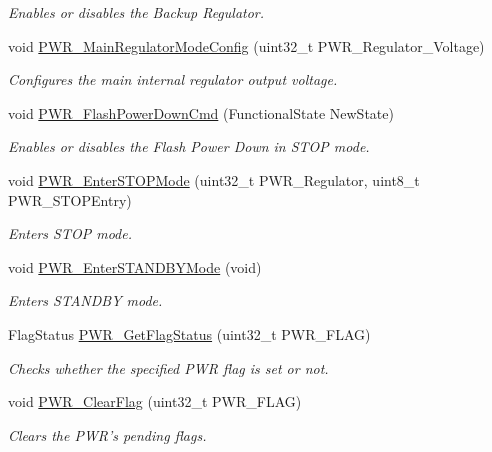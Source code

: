 \begin{DoxyCompactItemize}
\begin{DoxyCompactList}\small\item\em Enables or disables the Backup Regulator. \end{DoxyCompactList}\item 
void \hyperlink{group___p_w_r___exported___constants_gada193dea79762f379d4e666a98f28d89}{P\-W\-R\-\_\-\-Main\-Regulator\-Mode\-Config} (uint32\-\_\-t P\-W\-R\-\_\-\-Regulator\-\_\-\-Voltage)
\begin{DoxyCompactList}\small\item\em Configures the main internal regulator output voltage. \end{DoxyCompactList}\item 
void \hyperlink{group___p_w_r___exported___constants_gaf0af19a9fdf0324f2ada60c9bce1aab5}{P\-W\-R\-\_\-\-Flash\-Power\-Down\-Cmd} (Functional\-State New\-State)
\begin{DoxyCompactList}\small\item\em Enables or disables the Flash Power Down in S\-T\-O\-P mode. \end{DoxyCompactList}\item 
void \hyperlink{group___p_w_r___exported___constants_ga694676ac06a9baf50eae45adae0118ab}{P\-W\-R\-\_\-\-Enter\-S\-T\-O\-P\-Mode} (uint32\-\_\-t P\-W\-R\-\_\-\-Regulator, uint8\-\_\-t P\-W\-R\-\_\-\-S\-T\-O\-P\-Entry)
\begin{DoxyCompactList}\small\item\em Enters S\-T\-O\-P mode. \end{DoxyCompactList}\item 
void \hyperlink{group___p_w_r___exported___constants_ga00ddae00a9c327b81b24d2597b0052f3}{P\-W\-R\-\_\-\-Enter\-S\-T\-A\-N\-D\-B\-Y\-Mode} (void)
\begin{DoxyCompactList}\small\item\em Enters S\-T\-A\-N\-D\-B\-Y mode. \end{DoxyCompactList}\item 
Flag\-Status \hyperlink{group___p_w_r___exported___constants_gaa980163a4d83304280ee34942464b4ec}{P\-W\-R\-\_\-\-Get\-Flag\-Status} (uint32\-\_\-t P\-W\-R\-\_\-\-F\-L\-A\-G)
\begin{DoxyCompactList}\small\item\em Checks whether the specified P\-W\-R flag is set or not. \end{DoxyCompactList}\item 
void \hyperlink{group___p_w_r___exported___constants_ga01c4b2fbd16514b993324e101c3ddf7c}{P\-W\-R\-\_\-\-Clear\-Flag} (uint32\-\_\-t P\-W\-R\-\_\-\-F\-L\-A\-G)
\begin{DoxyCompactList}\small\item\em Clears the P\-W\-R's pending flags. \end{DoxyCompactList}\end{DoxyCompactItemize}


